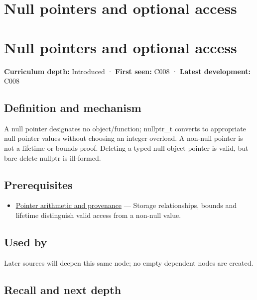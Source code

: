 \hypertarget{appendix-afae48c31800}{}
\section*{Null pointers and optional access}
\section{Null pointers and optional access}\label{appendix-afae48c31800-null-pointers-and-optional-access}

\textbf{Curriculum depth:} Introduced · \textbf{First seen:} C008 · \textbf{Latest development:} C008

\subsection{Definition and mechanism}\label{appendix-afae48c31800-definition-and-mechanism}

A null pointer designates no object/function; nullptr\_t converts to appropriate null pointer values without choosing an integer overload. A non-null pointer is not a lifetime or bounds proof. Deleting a typed null object pointer is valid, but bare delete nullptr is ill-formed.

\subsection{Prerequisites}\label{appendix-afae48c31800-prerequisites}

\begin{itemize}
\tightlist
\item
  \hyperref[appendix-6af5921bc853]{Pointer arithmetic and provenance} --- Storage relationships, bounds and lifetime distinguish valid access from a non-null value.
\end{itemize}

\subsection{Used by}\label{appendix-afae48c31800-used-by}

Later sources will deepen this same node; no empty dependent nodes are created.

\subsection{Recall and next depth}\label{appendix-afae48c31800-recall-and-next-depth}

